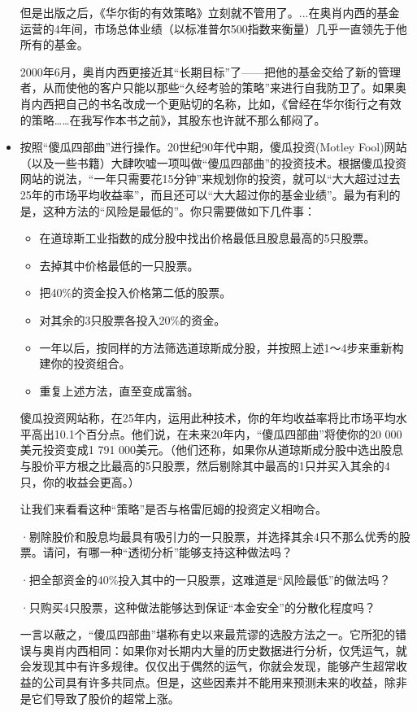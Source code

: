 \documentclass[12pt,oneside]{book}
\begin{document}
\begin{itemize}
但是出版之后，《华尔街的有效策略》立刻就不管用了。...在奥肖内西的基金运营的4年间，市场总体业绩（以标准普尔500指数来衡量）几乎一直领先于他所有的基金。

2000年6月，奥肖内西更接近其“长期目标”了——把他的基金交给了新的管理者，从而使他的客户只能以那些“久经考验的策略”来进行自我防卫了。如果奥肖内西把自己的书名改成一个更贴切的名称，比如，《曾经在华尔街行之有效的策略……在我写作本书之前》，其股东也许就不那么郁闷了。

\item 按照“傻瓜四部曲”进行操作。20世纪90年代中期，傻瓜投资(Motley Fool)网站（以及一些书籍）大肆吹嘘一项叫做“傻瓜四部曲”的投资技术。根据傻瓜投资网站的说法，“一年只需要花15分钟”来规划你的投资，就可以“大大超过过去25年的市场平均收益率”，而且还可以“大大超过你的基金业绩”。最为有利的是，这种方法的“风险是最低的”。你只需要做如下几件事：

\begin{itemize}
\item 在道琼斯工业指数的成分股中找出价格最低且股息最高的5只股票。
\item 去掉其中价格最低的一只股票。
\item 把40\%的资金投入价格第二低的股票。
\item 对其余的3只股票各投入20\%的资金。
\item 一年以后，按同样的方法筛选道琼斯成分股，并按照上述1～4步来重新构建你的投资组合。
\item 重复上述方法，直至变成富翁。
\end{itemize}

傻瓜投资网站称，在25年内，运用此种技术，你的年均收益率将比市场平均水平高出10.1个百分点。他们说，在未来20年内，“傻瓜四部曲”将使你的20 000美元投资变成1 791 000美元。（他们还称，如果你从道琼斯成分股中选出股息与股价平方根之比最高的5只股票，然后剔除其中最高的1只并买入其余的4只，你的收益会更高。）

让我们来看看这种“策略”是否与格雷厄姆的投资定义相吻合。

·剔除股价和股息均最具有吸引力的一只股票，并选择其余4只不那么优秀的股票。请问，有哪一种“透彻分析”能够支持这种做法吗？

·把全部资金的40\%投入其中的一只股票，这难道是“风险最低”的做法吗？

·只购买4只股票，这种做法能够达到保证“本金安全”的分散化程度吗？

一言以蔽之，“傻瓜四部曲”堪称有史以来最荒谬的选股方法之一。它所犯的错误与奥肖内西相同：如果你对长期内大量的历史数据进行分析，仅凭运气，就会发现其中有许多规律。仅仅出于偶然的运气，你就会发现，能够产生超常收益的公司具有许多共同点。但是，这些因素并不能用来预测未来的收益，除非是它们导致了股价的超常上涨。


\end{itemize}
\end{document}
